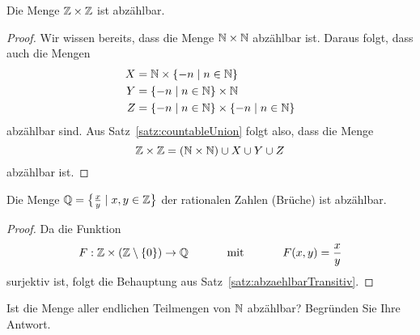 \begin{cor}
Die Menge $\mathbb{Z}\times \mathbb{Z}$ ist abzählbar.
\end{cor}
\begin{proof}
Wir wissen bereits, dass die Menge $\mathbb{N}\times\mathbb{N}$ abzählbar ist. Daraus folgt, dass auch die Mengen
\begin{align*}
X&=\mathbb{N}\times\{-n\mid n\in \mathbb{N}\}\\
Y&=\{-n\mid n\in \mathbb{N}\}\times\mathbb{N} \\
Z&=\{-n\mid n\in \mathbb{N}\}\times\{-n\mid n\in \mathbb{N}\}
\end{align*}
abzählbar sind. Aus Satz~\ref{satz:countableUnion} folgt also, dass die Menge
\[
\mathbb{Z}\times\mathbb{Z}=(\mathbb{N}\times\mathbb{N})\cup X\cup Y\cup Z
\]
abzählbar ist.
\end{proof}

\begin{cor}
Die Menge $\mathbb{Q}=\big\{\frac{x}{y}\mid x,y\in \mathbb{Z}\big\}$ der rationalen Zahlen (Brüche) ist abzählbar.
\end{cor}
\begin{proof}
Da die Funktion
\[
F:\mathbb{Z}\times(\mathbb{Z}\setminus{\{0\}})\to \mathbb{Q}\phantom{abstand}\text{mit}\phantom{abstand}F(x,y)=\frac{x}{y}
\]
surjektiv ist, folgt die Behauptung aus Satz~\ref{satz:abzaehlbarTransitiv}.
\end{proof}

\begin{ueb}
Ist die Menge aller endlichen Teilmengen von $\mathbb{N}$ abzählbar? Begründen Sie Ihre Antwort.
\end{ueb}
\begin{lsg}
\end{lsg}

